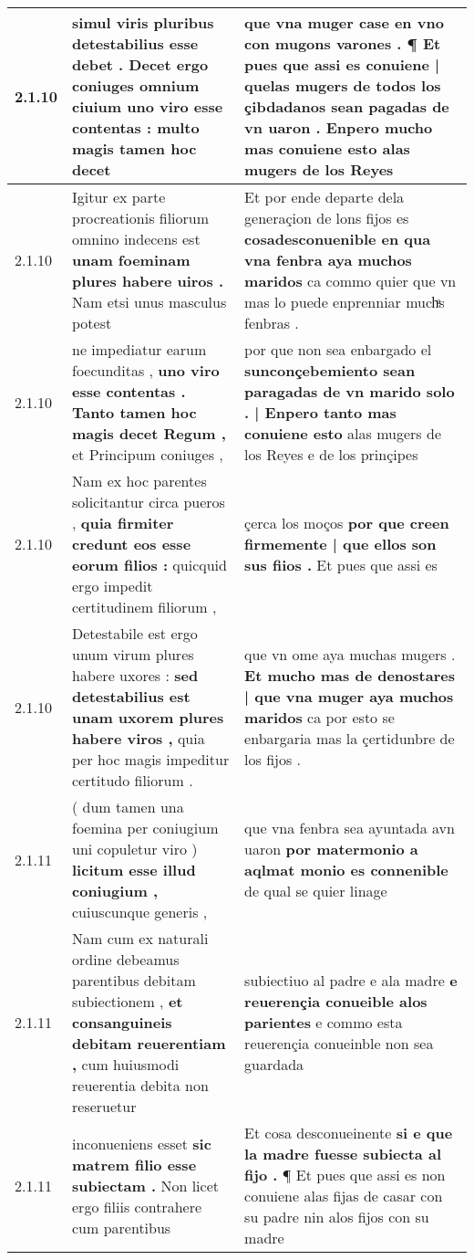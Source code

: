 \begin{tabular}{|p{1cm}|p{6.5cm}|p{6.5cm}|}
2.1.10 & simul viris pluribus detestabilius esse debet . \textbf{ Decet ergo coniuges omnium ciuium uno viro esse contentas : } multo magis tamen hoc decet & que vna muger case en vno con mugons varones . \textbf{ ¶ Et pues que assi es conuiene | quelas mugers de todos los çibdadanos sean pagadas de vn uaron . } Enpero mucho mas conuiene esto alas mugers de los Reyes \\\hline
2.1.10 & Igitur ex parte procreationis filiorum omnino indecens est \textbf{ unam foeminam plures habere uiros . } Nam etsi unus masculus potest & Et por ende departe dela generaçion de lons fijos es \textbf{ cosadesconuenible en qua vna fenbra aya muchos maridos } ca commo quier que vn mas lo puede enprenniar muchͣs fenbras . \\\hline
2.1.10 & ne impediatur earum foecunditas , \textbf{ uno viro esse contentas . Tanto tamen hoc magis decet Regum , } et Principum coniuges , & por que non sea enbargado el \textbf{ sunconçebemiento sean paragadas de vn marido solo . | Enpero tanto mas conuiene esto } alas mugers de los Reyes e de los prinçipes \\\hline
2.1.10 & Nam ex hoc parentes solicitantur circa pueros , \textbf{ quia firmiter credunt eos esse eorum filios : } quicquid ergo impedit certitudinem filiorum , & çerca los moços \textbf{ por que creen firmemente | que ellos son sus fiios . } Et pues que assi es \\\hline
2.1.10 & Detestabile est ergo unum virum plures habere uxores : \textbf{ sed detestabilius est unam uxorem plures habere viros , } quia per hoc magis impeditur certitudo filiorum . & que vn ome aya muchas mugers . \textbf{ Et mucho mas de denostares | que vna muger aya muchos maridos } ca por esto se enbargaria mas la çertidunbre de los fijos . \\\hline
2.1.11 & ( dum tamen una foemina per coniugium uni copuletur viro ) \textbf{ licitum esse illud coniugium , } cuiuscunque generis , & que vna fenbra sea ayuntada avn uaron \textbf{ por matermonio a aqlmat monio es connenible } de qual se quier linage \\\hline
2.1.11 & Nam cum ex naturali ordine debeamus parentibus debitam subiectionem , \textbf{ et consanguineis debitam reuerentiam , } cum huiusmodi reuerentia debita non reseruetur & subiectiuo al padre e ala madre \textbf{ e reuerençia conueible alos parientes } e commo esta reuerençia conueinble non sea guardada \\\hline
2.1.11 & inconueniens esset \textbf{ sic matrem filio esse subiectam . } Non licet ergo filiis contrahere cum parentibus & Et cosa desconueinente \textbf{ si e que la madre fuesse subiecta al fijo . } ¶ Et pues que assi es non conuiene alas fijas de casar con su padre nin alos fijos con su madre \\\hline

\end{tabular}
